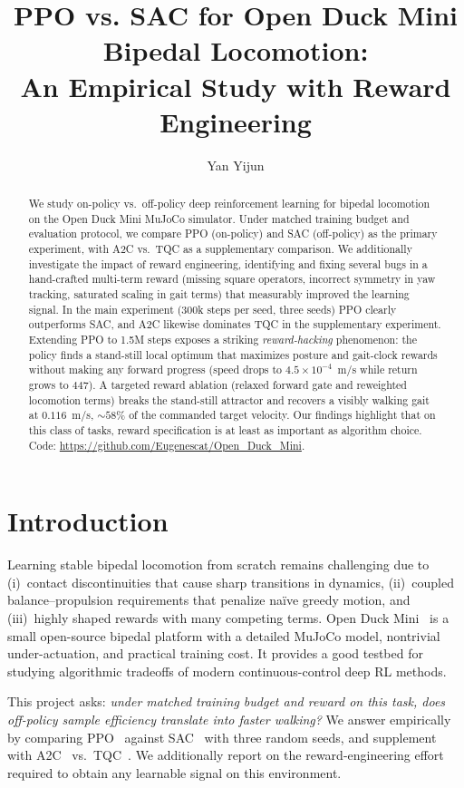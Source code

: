 \documentclass[letterpaper]{article}
\title{PPO vs. SAC for Open Duck Mini Bipedal Locomotion:\\ An Empirical Study with Reward Engineering}
\author{
Yan Yijun
}
\begin{document}
\maketitle

\begin{abstract}
We study on-policy vs.\ off-policy deep reinforcement learning for bipedal locomotion on the Open Duck Mini MuJoCo simulator. Under matched training budget and evaluation protocol, we compare PPO (on-policy) and SAC (off-policy) as the primary experiment, with A2C vs.\ TQC as a supplementary comparison. We additionally investigate the impact of reward engineering, identifying and fixing several bugs in a hand-crafted multi-term reward (missing square operators, incorrect symmetry in yaw tracking, saturated scaling in gait terms) that measurably improved the learning signal. In the main experiment (300k steps per seed, three seeds) PPO clearly outperforms SAC, and A2C likewise dominates TQC in the supplementary experiment. Extending PPO to 1.5M steps exposes a striking \emph{reward-hacking} phenomenon: the policy finds a stand-still local optimum that maximizes posture and gait-clock rewards without making any forward progress (speed drops to $4.5\times10^{-4}$~m/s while return grows to $447$). A targeted reward ablation (relaxed forward gate and reweighted locomotion terms) breaks the stand-still attractor and recovers a visibly walking gait at $0.116$~m/s, $\sim\!58\%$ of the commanded target velocity. Our findings highlight that on this class of tasks, reward specification is at least as important as algorithm choice. Code: \url{https://github.com/Eugenescat/Open_Duck_Mini}.
\end{abstract}

\section{Introduction}
Learning stable bipedal locomotion from scratch remains challenging due to
(i)~contact discontinuities that cause sharp transitions in dynamics,
(ii)~coupled balance--propulsion requirements that penalize na\"ive greedy motion,
and (iii)~highly shaped rewards with many competing terms.
Open Duck Mini~\citep{open_duck_mini} is a small open-source bipedal platform with a detailed MuJoCo model, nontrivial under-actuation, and practical training cost. It provides a good testbed for studying algorithmic tradeoffs of modern continuous-control deep RL methods.

This project asks: \emph{under matched training budget and reward on this task, does off-policy sample efficiency translate into faster walking?} We answer empirically by comparing PPO~\citep{schulman2017ppo} against SAC~\citep{haarnoja2018sac} with three random seeds, and supplement with A2C~\citep{mnih2016a3c} vs.\ TQC~\citep{kuznetsov2020tqc}. We additionally report on the reward-engineering effort required to obtain any learnable signal on this environment.
\end{document}
